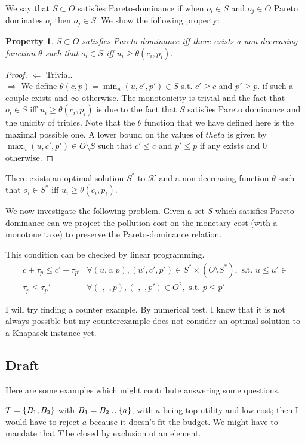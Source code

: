 \documentclass[version=3.21, pagesize, twoside=off, bibliography=totoc, DIV=calc, fontsize=12pt, a4paper, french, english]{scrartcl}
\newtheorem{property}{Property}
\begin{document}
We say that $S\subset O$ satisfies Pareto-dominance if when $o_i \in S$ and $o_j \in O$ Pareto dominates $o_i$ then $o_j \in S$.
We show the following property: 
\begin{property}
$S\subset O$ satisfies Pareto-dominance iff there exists a non-decreasing function $\theta$ such that $o_i\in S$ iff $u_i \ge \theta(c_i,p_i)$.
\end{property}
\begin{proof}
$\Leftarrow$ Trivial.\\
$\Rightarrow$ We define $\theta(c,p) = \min_{u} (u,c',p')\in S$ s.t. $c'\ge c$ and $p'\ge p$. if such a couple exists and $\infty$ otherwise. The monotonicity is trivial and the fact that $o_i\in S$ iff $u_i \ge \theta(c_i,p_i)$ is due to the fact that $S$ satisfies Pareto dominance and the unicity of triples. Note that the $\theta$ function that we have defined here is the maximal possible one. A lower bound on the values of $theta$ is given by $\max_u (u,c',p')\in O\setminus S$ such that $c'\le c$ and $p'\le p$ if any exists and $0$ otherwise.  
\end{proof}

\begin{corollary}
There exists an optimal solution $S^*$ to $\mathcal{K}$ and a non-decreasing function $\theta$ such that $o_i\in S^*$ iff $u_i \ge \theta(c_i,p_i)$.
\end{corollary}

We now investigate the following problem. Given a set $S$ which satisfies Pareto dominance can we project the pollution cost on the monetary cost (with a monotone taxe) to preserve the Pareto-dominance relation. 

This condition can be checked by linear programming. 
\begin{align}
c+\tau_p \le c' + \tau_{p'} &\forall (u,c,p), (u',c',p') \in S^*\times(O\setminus S^*) ,\text{ s.t. } u \le u' \in \\
\tau_p \le \tau_p' & \forall (\_,\_,p), (\_,\_,p') \in O^2 ,\text{ s.t. }  p \le p'
\end{align} 

I will try finding a counter example. By numerical test, I know that it is not always possible but my counterexample does not consider an optimal solution to a Knapasck instance yet.

\subsection{Draft}
Here are some examples which might contribute answering some questions.
\begin{example}
	$T = \{B_1, B_2\}$ with $B_1 = B_2 \cup \{a\}$, with $a$ being top utility and low cost; then I would have to reject $a$ because it doesn’t fit the budget.
	We might have to mandate that $T$ be closed by exclusion of an element.
\end{example}
\end{document}
